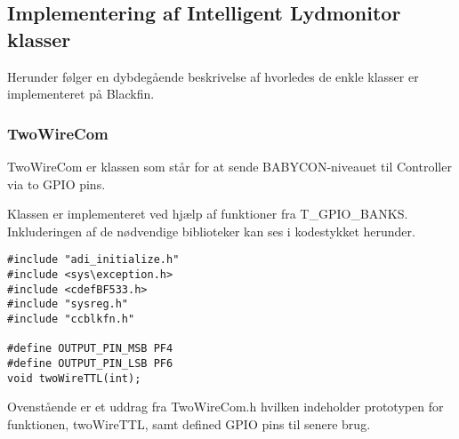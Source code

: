 
\subsection{Implementering af Intelligent Lydmonitor klasser}
Herunder følger en dybdegående beskrivelse af hvorledes de enkle klasser er implementeret på Blackfin.

\subsubsection{TwoWireCom}
TwoWireCom er klassen som står for at sende BABYCON-niveauet til Controller via to GPIO pins. 

Klassen er implementeret ved hjælp af funktioner fra T\_GPIO\_BANKS. Inkluderingen af de nødvendige biblioteker kan ses i kodestykket herunder. 

\begin{verbatim}
#include "adi_initialize.h"
#include <sys\exception.h>
#include <cdefBF533.h>
#include "sysreg.h"
#include "ccblkfn.h"

#define OUTPUT_PIN_MSB PF4
#define OUTPUT_PIN_LSB PF6
void twoWireTTL(int);
\end{verbatim}

Ovenstående er et uddrag fra TwoWireCom.h hvilken indeholder prototypen for funktionen, twoWireTTL, samt defined GPIO pins til senere brug.  